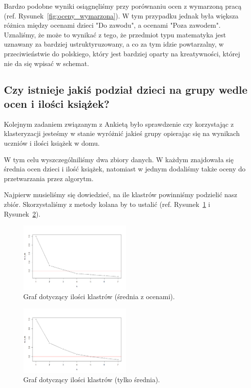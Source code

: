 \documentclass[conference]{IEEEtran}
\begin{document}
Bardzo podobne wyniki osiągnęliśmy przy porównaniu ocen z wymarzoną pracą (ref. Rysunek~\ref{fig:oceny_wymarzona}). W tym przypadku jednak była większa różnica między ocenami dzieci "Do zawodu", a ocenami "Poza zawodem". Uznaliśmy, że może to wynikać z tego, że przedmiot typu matematyka jest uznawany za bardziej ustruktyruzowany, a co za tym idzie powtarzalny, w przeciwieństwie do polskiego, który jest bardziej oparty na kreatywności, której nie da się wpisać w schemat.

\subsection{Czy istnieje jakiś podział dzieci na grupy wedle ocen i ilości książek?}

Kolejnym zadaniem związanym z Ankietą było sprawdzenie czy korzystając z klasteryzacji jesteśmy w stanie wyróżnić jakieś grupy opierając się na wynikach uczniów i ilości książek w domu.

W tym celu wyszczególniliśmy dwa zbiory danych. W każdym znajdowała się średnia ocen dzieci i ilość książek, natomiast w jednym dodaliśmy także oceny do przetwarzania przez algorytm.

Najpierw musieliśmy się dowiedzieć, na ile klastrów powinniśmy podzielić nasz zbiór. Skorzystaliśmy z metody kolana by to ustalić (ref. Rysunek~\ref{fig:kolano_jeden} i Rysunek~\ref{fig:kolano_dwa}).

\begin{figure}
	\centering
	\includegraphics[width=0.5\textwidth]{11.png}
	\caption{Graf dotyczący ilości klastrów (średnia z ocenami).}
	\label{fig:kolano_jeden}
\end{figure}
\begin{figure}
	\centering
	\includegraphics[width=0.5\textwidth]{12.png}
	\caption{Graf dotyczący ilości klastrów (tylko średnia).}
	\label{fig:kolano_dwa}
\end{figure}
\end{document}
